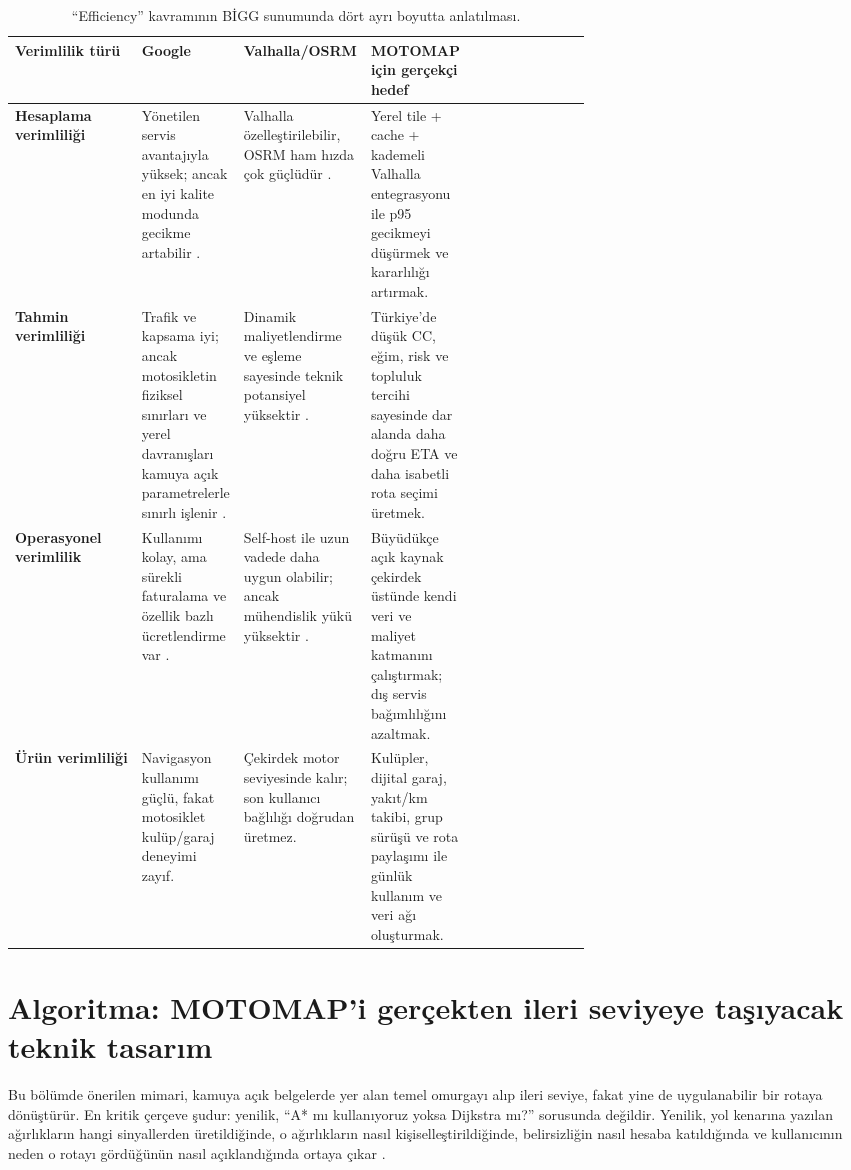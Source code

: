 \documentclass[11pt,a4paper]{article}
\begin{document}
\begin{table}[htbp]
\centering
\small
{}
\begin{tabularx}{\linewidth}{>{\bfseries}p{0.22\linewidth}p{0.15\linewidth}p{0.15\linewidth}p{0.15\linewidth}Y}
\toprule
Verimlilik türü & Google & Valhalla/OSRM & MOTOMAP için gerçekçi hedef \\
\midrule
Hesaplama verimliliği & Yönetilen servis avantajıyla yüksek; ancak en iyi kalite modunda gecikme artabilir \cite{o4}. & Valhalla özelleştirilebilir, OSRM ham hızda çok güçlüdür \cite{o7,o8,o14}. & Yerel tile + cache + kademeli Valhalla entegrasyonu ile p95 gecikmeyi düşürmek ve kararlılığı artırmak. \\
Tahmin verimliliği & Trafik ve kapsama iyi; ancak motosikletin fiziksel sınırları ve yerel davranışları kamuya açık parametrelerle sınırlı işlenir \cite{o1,o2,o6}. & Dinamik maliyetlendirme ve eşleme sayesinde teknik potansiyel yüksektir \cite{o8,o10,o11}. & Türkiye'de düşük CC, eğim, risk ve topluluk tercihi sayesinde dar alanda daha doğru ETA ve daha isabetli rota seçimi üretmek. \\
Operasyonel verimlilik & Kullanımı kolay, ama sürekli faturalama ve özellik bazlı ücretlendirme var \cite{o5}. & Self-host ile uzun vadede daha uygun olabilir; ancak mühendislik yükü yüksektir \cite{o7,o12,o14}. & Büyüdükçe açık kaynak çekirdek üstünde kendi veri ve maliyet katmanını çalıştırmak; dış servis bağımlılığını azaltmak. \\
Ürün verimliliği & Navigasyon kullanımı güçlü, fakat motosiklet kulüp/garaj deneyimi zayıf. & Çekirdek motor seviyesinde kalır; son kullanıcı bağlılığı doğrudan üretmez. & Kulüpler, dijital garaj, yakıt/km takibi, grup sürüşü ve rota paylaşımı ile günlük kullanım ve veri ağı oluşturmak. \\
\bottomrule
\end{tabularx}
\caption{``Efficiency'' kavramının BİGG sunumunda dört ayrı boyutta anlatılması.}
\end{table}

\section{Algoritma: MOTOMAP'i gerçekten ileri seviyeye taşıyacak teknik tasarım}

Bu bölümde önerilen mimari, kamuya açık belgelerde yer alan temel omurgayı alıp ileri seviye, fakat yine de uygulanabilir bir rotaya dönüştürür. En kritik çerçeve şudur: yenilik, ``A* mı kullanıyoruz yoksa Dijkstra mı?'' sorusunda değildir. Yenilik, yol kenarına yazılan ağırlıkların hangi sinyallerden üretildiğinde, o ağırlıkların nasıl kişiselleştirildiğinde, belirsizliğin nasıl hesaba katıldığında ve kullanıcının neden o rotayı gördüğünün nasıl açıklandığında ortaya çıkar \cite{u1,g2,g6,o8,o9}.
\end{document}
